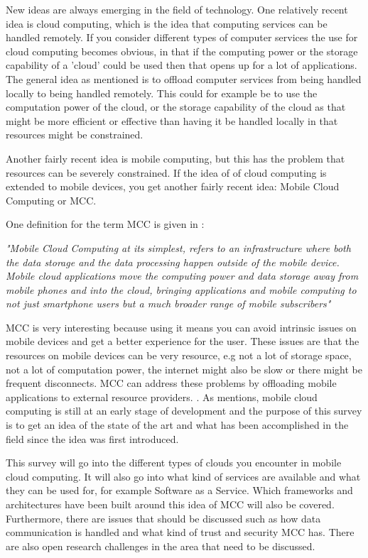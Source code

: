 
New ideas are always emerging in the field of technology.
One relatively recent idea is cloud computing, which is the idea that computing services can be handled remotely.
If you consider different types of computer services the use for cloud computing becomes obvious, in that if the computing power or the storage capability of a 'cloud' could be used then that opens up for a lot of applications.
The general idea as mentioned is to offload computer services from being handled locally to being handled remotely. 
This could for example be to use the computation power of the cloud, or the storage capability of the cloud as that might be more efficient or effective than having it be handled locally in that resources might be constrained.

Another fairly recent idea is mobile computing, but this has the problem that resources can be severely constrained. 
If the idea of of cloud computing is extended to mobile devices, you get another fairly recent idea: Mobile Cloud Computing or MCC.

One definition for the term MCC is given in \citet{article:mobilecloudreviewinderkildesecurity}:

\textit{"Mobile Cloud Computing at its simplest, refers to an infrastructure where both the data storage and the data processing happen outside of the mobile device. Mobile cloud applications move the computing power and data storage away from mobile phones and into the cloud, bringing applications and mobile computing to not just smartphone users but a much broader range of mobile subscribers"}

MCC is very interesting because using it means you can avoid intrinsic issues on mobile devices and get a better experience for the user. 
These issues are that the resources on mobile devices can be very resource, e.g not a lot of storage space, not a lot of computation power, the internet might also be slow or there might be frequent disconnects.
MCC can address these problems by offloading mobile applications to external resource providers. \citet{fernando2013mobile}.
As \citet{6215350} mentions, mobile cloud computing is still at an early stage of development and the purpose of this survey is to get an idea of the state of the art and what has been accomplished in the field since the idea was first introduced. 

This survey will go into the different types of clouds you encounter in mobile cloud computing.
It will also go into what kind of services are available and what they can be used for, for example Software as a Service.
Which frameworks and architectures have been built around this idea of MCC will also be covered. 
Furthermore, there are issues that should be discussed such as how data communication is handled and what kind of trust and security MCC has. 
There are also open research challenges in the area that need to be discussed. 